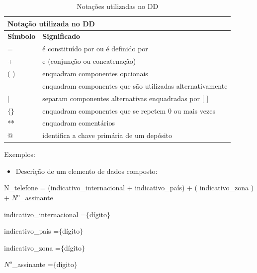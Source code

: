 \documentclass[12pt,a4paper]{article}
\begin{document}
\begin{center}
\begin{table}[h!]
	
	\label{tabela:tiposAtividades}
	\begin{tabular}{|p{2.5cm}|p{13.5cm}|}\hline	
		\multicolumn{2}{|p{17cm}|}{\cellcolor{cinzaClaro}  \centering Notação utilizada no DD} \\ \hline %
		 \textbf{Símbolo}   &  \textbf{Significado} \\\hline %
		
		 =  & é constituído por ou é definido por \\\hline
		  +   &  e (conjunção ou concatenação)\\\hline
		   ( )   &  enquadram componentes opcionais\\\hline
		    [ ]  & enquadram componentes que são utilizadas alternativamente \\\hline
		     $\vert$  & separam componentes alternativas enquadradas por [ ] \\\hline
		      $\lbrace  \rbrace$  & enquadram componentes que se repetem 0 ou mais vezes \\\hline
		       **  & enquadram comentários\\\hline
		        @  & identifica a chave primária de um depósito \\\hline
			
	\end{tabular}
	\caption{Notações utilizadas no DD}
\end{table}	
\end{center}

Exemplos:

\begin{itemize}
\item Descrição de um elemento de dados composto:
\end{itemize}

N\_telefone = (indicativo\_internacional + indicativo\_país)	+ ( indicativo\_zona ) + $N^{o}$\_assinante

indicativo\_internacional =$\lbrace$dígito$\rbrace$

indicativo\_país =$\lbrace$dígito$\rbrace$

indicativo\_zona =$\lbrace$dígito$\rbrace$

$N^{o}$\_assinante =$\lbrace$dígito$\rbrace$\\\\
\end{document}

